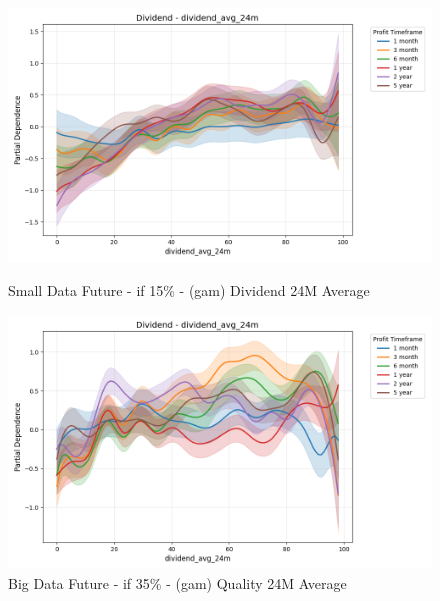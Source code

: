 \documentclass[11pt,english,a4paper,hidelinks]{book}
\begin{document}
\begin{figure}[H]
    \centering
    \begin{minipage}{0.48\textwidth}
        \centering
        \includegraphics[width=\textwidth]{images/code/models/general_regression/splines/2D/Small Data future - IF/dividend_dividend_avg_24m.png}
        \caption{Small Data Future - \acrshort{if} 15\% - (\acrshort{gam}) Dividend 24M Average}
        \label{fig:spline_dividend_dividend_avg_24m}
    \end{minipage}\hfill
    \begin{minipage}{0.48\textwidth}
        \centering
        \includegraphics[width=\textwidth]{images/code/models/general_regression/splines/2D/Big Data future - IF HARD Balanced/dividend_dividend_avg_24m.png}
        \caption{Big Data Future - \acrshort{if} 35\% - (\acrshort{gam}) Quality 24M Average}
        \label{fig:spline_dividend_dividend_avg_24m_balanced}
    \end{minipage}
\end{figure}
\end{document}
